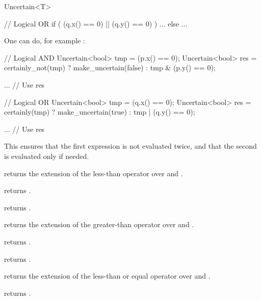 \begin{ccRefClass}{Uncertain<T>}
\begin{ccExampleCode}
  // Logical OR
  if ( (q.x() == 0) || (q.y() == 0) )
    ...
  else
    ...
\end{ccExampleCode}

  One can do, for example :

\begin{ccExampleCode}
  // Logical AND
  Uncertain<bool> tmp = (p.x() == 0);
  Uncertain<bool> res = certainly_not(tmp) ? make_uncertain(false) : tmp & (p.y() == 0);

  ... // Use res

  // Logical OR
  Uncertain<bool> tmp = (q.x() == 0);
  Uncertain<bool> res = certainly(tmp) ? make_uncertain(true) : tmp | (q.y() == 0);

  ... // Use res
\end{ccExampleCode}

  This ensures that the first expression is not evaluated twice, and that the second is
  evaluated only if needed.


  {returns the extension of the less-than operator over  and .}

  {returns .}

  {returns .}

  {returns the extension of the greater-than operator over  and .}

  {returns .}

  {returns .}

  {returns the extension of the less-than or equal operator over  and .}

  {returns .}


\end{ccRefClass}
